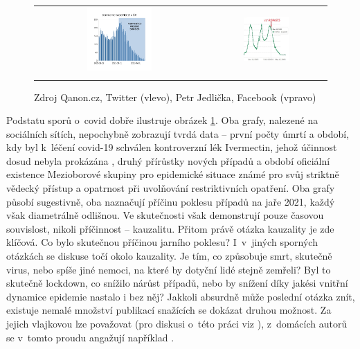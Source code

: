 \begin{figure}
\begin{center}
\begin{tabular}{cc}
\includegraphics[width=0.4\textwidth]{pic/ivernectin.pdf} & \includegraphics[width=0.4\textwidth]{pic/meses.png}\tabularnewline
\tabularnewline
\end{tabular}
\caption{Zdroj Qanon.cz, Twitter (vlevo), Petr Jedlička, Facebook (vpravo)}
\label{fig:iverjedl}
\end{center}
\end{figure}

Podstatu sporů o~covid dobře ilustruje obrázek \ref{fig:iverjedl}. Oba grafy, nalezené na sociálních sítích, nepochybně zobrazují tvrdá data -- první počty úmrtí a období,
kdy byl k~léčení covid-19 schválen kontroverzní
lék Ivermectin, jehož účinnost dosud nebyla prokázána \cite{mzcriver},
druhý přírůstky nových případů a období oficiální existence Mezioborové
skupiny pro epidemické situace \cite{zalozenimeses} známé pro svůj
striktně vědecký přístup a opatrnost při uvolňování restriktivních
opatření. Oba grafy působí sugestivně, oba naznačují příčinu poklesu případů
na jaře 2021, každý však diametrálně odlišnou. Ve skutečnosti však demonstrují pouze časovou souvislost, nikoli příčinnost -- kauzalitu. Přitom právě otázka kauzality je zde klíčová. Co bylo skutečnou příčinou jarního poklesu? I~v~jiných sporných otázkách se diskuse točí okolo kauzality. Je tím, co
způsobuje smrt, skutečně virus, nebo spíše jiné nemoci, na které by dotyční lidé stejně zemřeli? Byl to skutečně lockdown, co snížilo nárůst případů,
nebo by snížení díky jakési vnitřní dynamice epidemie nastalo i bez něj? Jakkoli
absurdně může poslední otázka znít, existuje nemalé množství publikací
snažících se dokázat druhou možnost. Za jejich vlajkovou lze považovat \cite{bendavid2021assessing}
(pro diskusi o~této práci viz \cite{kluveitIoan}), z~domácích autorů
se v~tomto proudu angažují například \cite{hradsky2021demographic}. 

